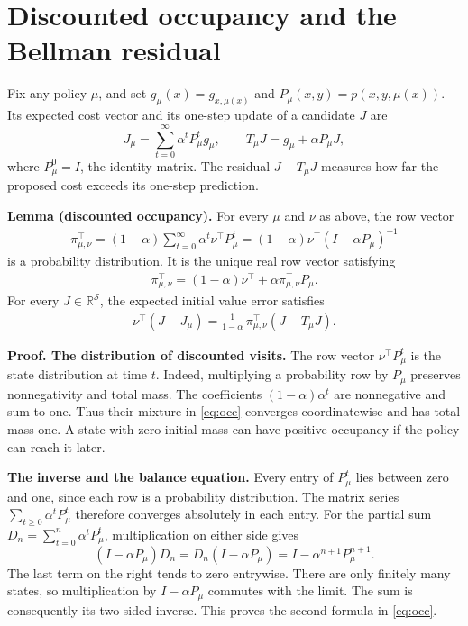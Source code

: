 \documentclass[12pt,a4paper]{article}
\newcommand{\R}{\mathbb R}
\newcommand{\lead}[1]{\par\smallskip\noindent\textbf{#1}\enspace}
\begin{document}
\newpage
\section*{Discounted occupancy and the Bellman residual}
Fix any policy \(\mu\), and set \(g_\mu(x)=g_{x,\mu(x)}\) and
\(P_\mu(x,y)=p(x,y,\mu(x))\). Its expected cost vector and its one-step
update of a candidate \(J\) are
\[
 J_\mu=\sum_{t=0}^\infty\alpha^tP_\mu^t g_\mu,\qquad
 T_\mu J=g_\mu+\alpha P_\mu J ,
\]
where \(P_\mu^0=I\), the identity matrix. The residual \(J-T_\mu J\)
measures how far the proposed cost exceeds its one-step prediction.

\textbf{Lemma (discounted occupancy).} For every \(\mu\) and \(\nu\) as above, the row vector
\begin{align}
 \pi_{\mu,\nu}^{\top}
 =(1-\alpha)\sum_{t=0}^{\infty}\alpha^t\nu^\top P_\mu^t
 =(1-\alpha)\nu^\top(I-\alpha P_\mu)^{-1}
 \tag{17}\label{eq:occ}
\end{align}
is a probability distribution. It is the unique real row vector satisfying
\begin{align}
 \pi_{\mu,\nu}^{\top}=(1-\alpha)\nu^\top+\alpha\pi_{\mu,\nu}^{\top}P_\mu .
 \tag{B}\label{eq:balance}
\end{align}
For every \(J\in\R^{\mathcal S}\), the expected initial value error satisfies
\begin{align}
 \nu^\top(J-J_\mu)
   =\frac{1}{1-\alpha}\,\pi_{\mu,\nu}^{\top}(J-T_\mu J).
 \tag{R}\label{eq:residual}
\end{align}

\lead{Proof. The distribution of discounted visits.}
The row vector \(\nu^\top P_\mu^t\) is the state distribution at time \(t\).
Indeed, multiplying a probability row by \(P_\mu\) preserves
nonnegativity and total mass. The coefficients \((1-\alpha)\alpha^t\)
are nonnegative and sum to one. Thus their mixture in \eqref{eq:occ}
converges coordinatewise and has total mass one. A state with zero initial
mass can have positive occupancy if the policy can reach it later.

\lead{The inverse and the balance equation.}
Every entry of \(P_\mu^t\) lies between zero and one, since each row is
a probability distribution. The matrix series \(\sum_{t\ge0}\alpha^tP_\mu^t\)
therefore converges absolutely in each entry. For the partial sum
\(D_n=\sum_{t=0}^{n}\alpha^tP_\mu^t\), multiplication on either side gives
\[
  (I-\alpha P_\mu)D_n
      =D_n(I-\alpha P_\mu)=I-\alpha^{n+1}P_\mu^{n+1}.
\]
The last term on the right tends to zero entrywise. There are only finitely
many states, so multiplication by \(I-\alpha P_\mu\) commutes with the
limit. The sum is consequently its two-sided inverse. This proves the
second formula in \eqref{eq:occ}.
\end{document}
